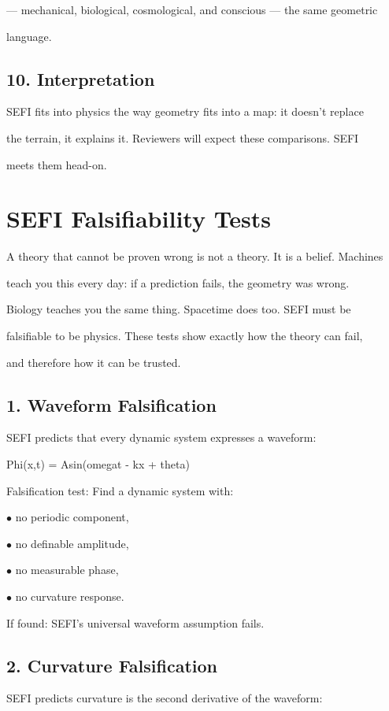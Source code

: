 \documentclass[10pt]{article}
\begin{document}
--- mechanical, biological, cosmological, and conscious --- the same geometric

language.

\subsection*{10. Interpretation}
SEFI fits into physics the way geometry fits into a map: it doesn't replace

the terrain, it explains it. Reviewers will expect these comparisons. SEFI

meets them head-on.

\section*{SEFI Falsifiability Tests}
A theory that cannot be proven wrong is not a theory. It is a belief. Machines

teach you this every day: if a prediction fails, the geometry was wrong.

Biology teaches you the same thing. Spacetime does too. SEFI must be

falsifiable to be physics. These tests show exactly how the theory can fail,

and therefore how it can be trusted.

\subsection*{1. Waveform Falsification}
SEFI predicts that every dynamic system expresses a waveform:

Phi(x,t) = Asin(omegat - kx + theta)

Falsification test: Find a dynamic system with:

\noindent $\bullet$ no periodic component,

\noindent $\bullet$ no definable amplitude,


\noindent $\bullet$ no measurable phase,

\noindent $\bullet$ no curvature response.

If found: SEFI's universal waveform assumption fails.

\subsection*{2. Curvature Falsification}
SEFI predicts curvature is the second derivative of the waveform:
\end{document}
